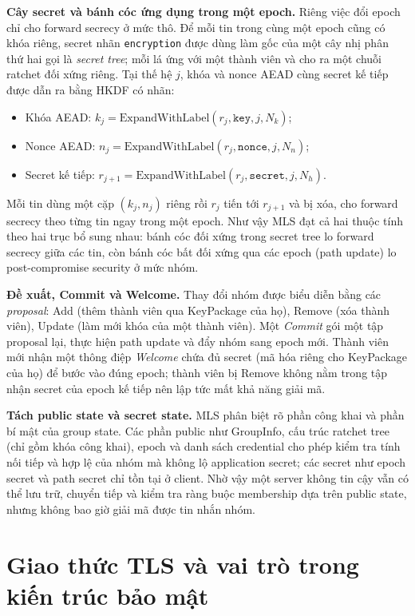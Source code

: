 \textbf{Cây secret và bánh cóc ứng dụng trong một epoch.} Riêng việc đổi epoch chỉ cho forward secrecy ở mức thô. Để mỗi tin trong cùng một epoch cũng có khóa riêng, secret nhãn \texttt{encryption} được dùng làm gốc của một cây nhị phân thứ hai gọi là \emph{secret tree}; mỗi lá ứng với một thành viên và cho ra một chuỗi ratchet đối xứng riêng. Tại thế hệ $j$, khóa và nonce AEAD cùng secret kế tiếp được dẫn ra bằng HKDF có nhãn:

\begin{itemize}
  \item Khóa AEAD: $k_j = \mathrm{ExpandWithLabel}(r_j, \mathtt{key}, j, N_k)$;
  \item Nonce AEAD: $n_j = \mathrm{ExpandWithLabel}(r_j, \mathtt{nonce}, j, N_n)$;
  \item Secret kế tiếp: $r_{j+1} = \mathrm{ExpandWithLabel}(r_j, \mathtt{secret}, j, N_h)$.
\end{itemize}

Mỗi tin dùng một cặp $(k_j, n_j)$ riêng rồi $r_j$ tiến tới $r_{j+1}$ và bị xóa, cho forward secrecy theo từng tin ngay trong một epoch. Như vậy MLS đạt cả hai thuộc tính theo hai trục bổ sung nhau: bánh cóc đối xứng trong secret tree lo forward secrecy giữa các tin, còn bánh cóc bất đối xứng qua các epoch (path update) lo post-compromise security ở mức nhóm.

\textbf{Đề xuất, Commit và Welcome.} Thay đổi nhóm được biểu diễn bằng các \emph{proposal}: Add (thêm thành viên qua KeyPackage của họ), Remove (xóa thành viên), Update (làm mới khóa của một thành viên). Một \emph{Commit} gói một tập proposal lại, thực hiện path update và đẩy nhóm sang epoch mới. Thành viên mới nhận một thông điệp \emph{Welcome} chứa đủ secret (mã hóa riêng cho KeyPackage của họ) để bước vào đúng epoch; thành viên bị Remove không nằm trong tập nhận secret của epoch kế tiếp nên lập tức mất khả năng giải mã.

\textbf{Tách public state và secret state.} MLS phân biệt rõ phần công khai và phần bí mật của group state. Các phần public như GroupInfo, cấu trúc ratchet tree (chỉ gồm khóa công khai), epoch và danh sách credential cho phép kiểm tra tính nối tiếp và hợp lệ của nhóm mà không lộ application secret; các secret như epoch secret và path secret chỉ tồn tại ở client. Nhờ vậy một server không tin cậy vẫn có thể lưu trữ, chuyển tiếp và kiểm tra ràng buộc membership dựa trên public state, nhưng không bao giờ giải mã được tin nhắn nhóm.

\section{Giao thức TLS và vai trò trong kiến trúc bảo mật}

